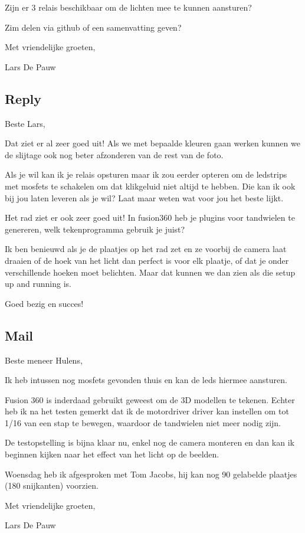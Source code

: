 \documentclass{scrartcl}
\begin{document}
Zijn er 3 relais beschikbaar om de lichten mee te kunnen aansturen?

Zim delen via github of een samenvatting geven?

 

 

Met vriendelijke groeten,

 

Lars De Pauw



\subsection{Reply}

Beste Lars,



Dat ziet er al zeer goed uit! Als we met bepaalde kleuren gaan werken kunnen we de slijtage ook nog beter afzonderen van de rest van de foto.



Als je wil kan ik je relais opsturen maar ik zou eerder opteren om de ledstrips met mosfets te schakelen om dat klikgeluid niet altijd te hebben. Die kan ik ook bij jou laten leveren als je wil? Laat maar weten wat voor jou het beste lijkt.



Het rad ziet er ook zeer goed uit! In fusion360 heb je plugins voor tandwielen te genereren, welk tekenprogramma gebruik je juist?



Ik ben benieuwd als je de plaatjes op het rad zet en ze voorbij de camera laat draaien of de hoek van het licht dan perfect is voor elk plaatje, of dat je onder verschillende hoeken moet belichten. Maar dat kunnen we dan zien als die setup up and running is.



Goed bezig en succes!



\subsection{Mail}

Beste meneer Hulens,

 

Ik heb intussen nog mosfets gevonden thuis en kan de leds hiermee aansturen.

 Fusion 360 is inderdaad gebruikt geweest om de 3D modellen te tekenen. Echter heb ik na het testen gemerkt dat ik de motordriver driver kan instellen om tot 1/16 van een stap te bewegen, waardoor de tandwielen niet meer nodig zijn.

 

De testopstelling is bijna klaar nu, enkel nog de camera monteren en dan kan ik beginnen kijken naar het effect van het licht op de beelden.

 

Woensdag heb ik afgesproken met Tom Jacobs, hij kan nog 90 gelabelde plaatjes (180 snijkanten) voorzien.

 

Met vriendelijke groeten,

 

Lars De Pauw
\end{document}
